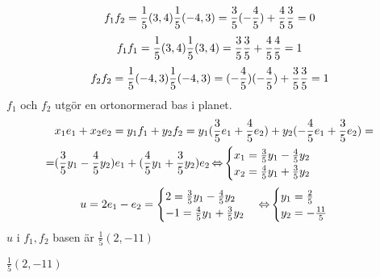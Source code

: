 \pagebreak
\begin{task}{4.8}
	\[f_1\*f_2=\frac{1}{5}(3,4)\*\frac{1}{5}(-4,3)=\frac{3}{5}\*(-\frac{4}{5})+\frac{4}{5}\*\frac{3}{5}=0\]
	\[f_1\*f_1=\frac{1}{5}(3,4)\*\frac{1}{5}(3,4)=\frac{3}{5}\*\frac{3}{5}+\frac{4}{5}\*\frac{4}{5}=1\]
	\[f_2\*f_2=\frac{1}{5}(-4,3)\*\frac{1}{5}(-4,3)=(-\frac{4}{5})\*(-\frac{4}{5})+\frac{3}{5}\*\frac{3}{5}=1\]
	$f_1$ och $f_2$ utgör en ortonormerad bas i planet.
	\begin{align*}
		&x_1e_1+x_2e_2=y_1f_1+y_2f_2=
		y_1(\frac{3}{5}e_1+\frac{4}{5}e_2)+y_2(-\frac{4}{5}e_1+\frac{3}{5}e_2)= \\ =
		&(\frac{3}{5}y_1-\frac{4}{5}y_2)e_1+(\frac{4}{5}y_1+\frac{3}{5}y_2)e_2 \operatorname{\Leftrightarrow}
		\begin{cases}
			x_1=\frac{3}{5}y_1-\frac{4}{5}y_2 \\
			x_2=\frac{4}{5}y_1+\frac{3}{5}y_2
		\end{cases}
	\end{align*}
	\[u=2e_1-e_2=
	\begin{cases}
		2=\frac{3}{5}y_1-\frac{4}{5}y_2 \\
		-1=\frac{4}{5}y_1+\frac{3}{5}y_2
	\end{cases} \operatorname{\Leftrightarrow}
	\begin{cases}
		y_1=\frac{2}{5} \\
		y_2=-\frac{11}{5}
	\end{cases}
	\]
	$u$ i $f_1,f_2$ basen är $\frac{1}{5}(2,-11)$
	
	\ans $\frac{1}{5}(2,-11)$
\end{task}

